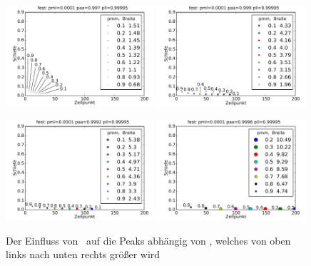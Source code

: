 \begin{figure}[]
\includegraphics[width=0.49\textwidth]{bilder/pmm/3fest_p_00001_0997_099995}
\includegraphics[width=0.49\textwidth]{bilder/pmm/3fest_p_00001_0999_099995}

\vspace*{5pt}

\includegraphics[width=0.49\textwidth]{bilder/pmm/3fest_p_00001_09992_099995}
\includegraphics[width=0.49\textwidth]{bilder/pmm/3fest_p_00001_09996_099995}
\caption[Der Einfluss von \pmm\ auf die Peaks abhängig von \paa]{Der Einfluss von \pmm\ auf die Peaks abhängig von \paa, welches von oben links nach unten rechts größer wird}
\label{einfluss_pmm_1}
\end{figure}


